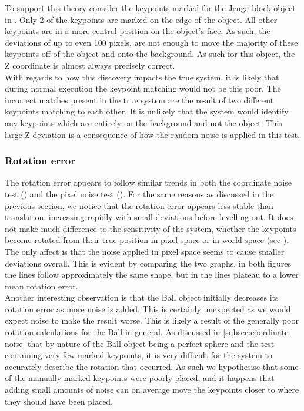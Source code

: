 To support this theory consider the keypoints marked for the Jenga block object in . Only 2 of the keypoints are marked on the edge of the object. All other keypoints are in a more central position on the object's face. As such, the deviations of up to even 100 pixels, are not enough to move the majority of these keypoints off of the object and onto the background. As such for this object, the Z coordinate is almost always precisely correct.\\

With regards to how this discovery impacts the true system, it is likely that during normal execution the keypoint matching would not be this poor. The incorrect matches present in the true system are the result of two different keypoints matching to each other. It is unlikely that the system would identify any keypoints which are entirely on the background and not the object. This large Z deviation is a consequence of how the random noise is applied in this test.

\subsubsection{Rotation error}
The rotation error appears to follow similar trends in both the coordinate noise test () and the pixel noise test (). For the same reasons as discussed in the previous section, we notice that the rotation error appears less stable than translation, increasing rapidly with small deviations before levelling out. It does not make much difference to the sensitivity of the system, whether the keypoints become rotated from their true position in pixel space or in world space (see ). The only affect is that the noise applied in pixel space seems to cause smaller deviations overall. This is evident by comparing the two graphs, in both figures the lines follow approximately the same shape, but in  the lines plateau to a lower mean rotation error.\\

Another interesting observation is that the Ball object initially decreases its rotation error as more noise is added. This is certainly unexpected as we would expect noise to make the result worse. This is likely a result of the generally poor rotation calculations for the Ball in general. As discussed in \ref{subsec:coordinate-noise} that by nature of the Ball object being a perfect sphere and the test containing very few marked keypoints, it is very difficult for the system to accurately describe the rotation that occurred. As such we hypothesise that some of the manually marked keypoints were poorly placed, and it happens that adding small amounts of noise can on average move the keypoints closer to where they should have been placed.

